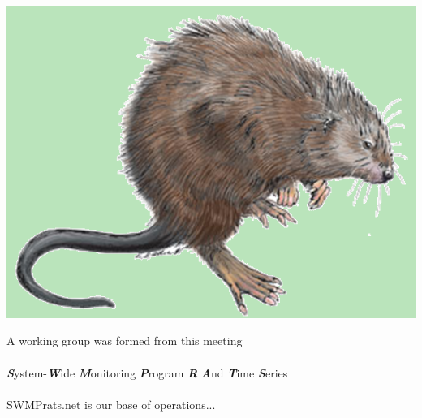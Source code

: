 \documentclass[serif]{beamer}\usepackage[]{graphicx}\usepackage[]{color}
\newcommand{\Bigtxt}[1]{\textbf{\textit{#1}}}
\begin{document}
\begin{frame}{\includegraphics[width=0.05\paperwidth]{fig/muskrat.png}\hspace{0.07in}{\bf Genesis of SWMPrats}}
\centerline{}
\vspace{0.2in}
A working group was formed from this meeting \\~\\
\Bigtxt{S}ystem-\Bigtxt{W}ide \Bigtxt{M}onitoring \Bigtxt{P}rogram \Bigtxt{R} \Bigtxt{A}nd \Bigtxt{T}ime \Bigtxt{S}eries \\~\\
SWMPrats.net is our base of operations...
\end{frame}
\end{document}
